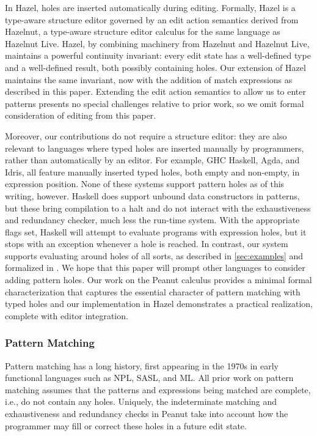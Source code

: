 In Hazel, holes are inserted automatically during editing. Formally, Hazel is a type-aware structure editor governed by an edit action semantics derived from Hazelnut, a type-aware structure editor calculus 
for the same language as Hazelnut Live. 
Hazel, by combining machinery from Hazelnut and Hazelnut Live, maintains a powerful continuity invariant: every edit state has a well-defined type
and a well-defined result, both possibly containing holes.
Our extension of Hazel maintains the same invariant, now with the addition of match expressions 
as described in this paper. 
Extending the edit action semantics to allow us to enter patterns presents no special challenges relative to prior work, so we omit formal consideration of editing from this paper.

Moreover, our contributions do not require a structure editor: they are also relevant to languages where typed holes are inserted 
manually by programmers, rather than automatically by an editor. 
For example, GHC Haskell, Agda, and Idris, all feature manually inserted typed holes, both empty and non-empty, in expression position. 
None of these systems support pattern holes as of this writing, however. Haskell does support unbound data constructors in patterns, but these bring compilation to a halt and do not interact with the exhaustiveness and redundancy checker, much less the run-time system. With the appropriate flags set, Haskell will attempt to evaluate programs with expression holes, but it stops with an exception whenever a hole is reached. In contrast, our system supports evaluating around holes of all sorts, as described in \autoref{sec:examples} and formalized in . We hope that this paper will prompt other languages to 
consider adding pattern holes. Our work on the Peanut calculus provides a minimal formal characterization 
that captures the essential character of pattern matching with typed holes and our implementation in Hazel 
demonstrates a practical realization, complete with editor integration.

\subsubsection{Pattern Matching}
Pattern matching has a long history, first appearing in the 1970s in early functional languages
such as NPL, SASL, and ML.
All prior work on pattern matching assumes that the patterns and expressions being matched are
complete, i.e., do not contain any holes.
Uniquely, the indeterminate matching and exhaustiveness and redundancy checks in Peanut
take into account how the programmer may fill or correct these holes in a future edit state.

